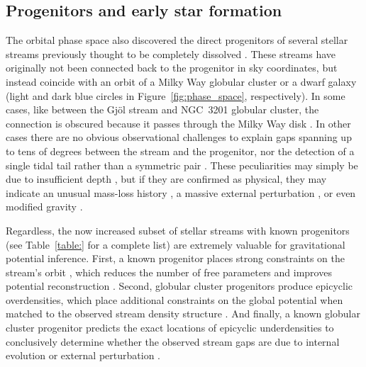 \documentclass[final,5p,times,twocolumn,authoryear]{elsarticle}
\begin{document}
\subsection{Progenitors and early star formation}
The orbital phase space also discovered the direct progenitors of several stellar streams previously thought to be completely dissolved \citep{palau:2019,riley:2020,ibata:2019b,ibata:2021,bonaca:2021}.
These streams have originally not been connected back to the progenitor in sky coordinates, but instead coincide with an orbit of a Milky Way globular cluster or a dwarf galaxy (light and dark blue circles in Figure~\ref{fig:phase_space}, respectively).
In some cases, like between the Gj\" ol stream and NGC~3201 globular cluster, the connection is obscured because it passes through the Milky Way disk \citep{riley:2020}.
In other cases there are no obvious observational challenges to explain gaps spanning up to tens of degrees between the stream and the progenitor, nor the detection of a single tidal tail rather than a symmetric pair \citep[e.g,][]{bonaca:2021, yang:2022b}.
These peculiarities may simply be due to insufficient depth \citep[e.g., non-detections of the low-mass stars that populate cluster tails in the early phases of dissolution][]{balbinot:2018}, but if they are confirmed as physical, they may indicate an unusual mass-loss history \citep[e.g., due to a population of black holes in the progenitor][]{roberts:2024}, a massive external perturbation \citep[e.g., from the Galactic bar,][]{pearson:2017}, or even modified gravity \citep[causing asymmetric escape into the leading and trailing tails][]{thomas:2018}.

Regardless, the now increased subset of stellar streams with known progenitors (see Table~\ref{table:} for a complete list) are extremely valuable for gravitational potential inference.
First, a known progenitor places strong constraints on the stream's orbit \citep{bh:2018}, which reduces the number of free parameters and improves potential reconstruction \citep{palau:2023}.
Second, globular cluster progenitors produce epicyclic overdensities, which place additional constraints on the global potential when matched to the observed stream density structure \citep{kupper:2015}.
And finally, a known globular cluster progenitor predicts the exact locations of epicyclic underdensities to conclusively determine whether the observed stream gaps are due to internal evolution or external perturbation \citep[cf.][]{ibata:2020}.
\end{document}
